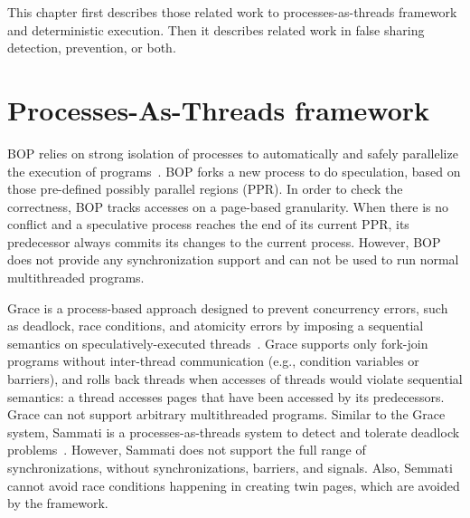 
\label{chapter:relatedwork}
This chapter first describes those related work to processes-as-threads framework and deterministic execution. Then it describes related work in false sharing detection, prevention, or both. 

\section{Processes-As-Threads framework}

BOP relies on strong isolation of processes to automatically and safely parallelize the execution of programs~\cite{DingBOP}. BOP forks a new process to do speculation, based on those pre-defined possibly parallel regions (PPR). In order to check the correctness, BOP tracks accesses on a page-based granularity. When there is no conflict and a speculative process reaches the end of its current PPR, its predecessor always commits its changes to the current process. However, BOP does not provide any synchronization support and can not be used to run normal multithreaded programs. 

Grace is a process-based approach designed to prevent
concurrency errors, such as deadlock, race conditions, and
atomicity errors by imposing a sequential semantics on
speculatively-executed threads~\cite{grace}. Grace supports only fork-join programs without inter-thread communication (e.g., condition variables or barriers), and rolls back threads when accesses of threads would violate sequential semantics: a thread accesses pages that have been accessed by its predecessors. Grace can not support arbitrary multithreaded programs. Similar to the Grace system, Sammati is a processes-as-threads system to detect and tolerate deadlock problems~\cite{Pyla:2010:ADA:1854273.1854288}. However, Sammati does not support the full range of synchronizations, without synchronizations, barriers, and signals. Also, Semmati cannot avoid race conditions happening in creating twin pages, which are avoided by the \Sheriff{} framework.

\begin{comment}
According to Revisions,  Grace cannot easily resolve all
conflicts on commit (like revisions do) and must thus restrict
tasks from producing such conflicts either statically (by type
system) or dynamically (pessimistic with blocking, or optimistic with abort and retry). Also, Grace allows only a restricted “fork-join” form of concurrency
Revisions~\ref{Burckhardt:2010:CPR:1869459.1869515}
\end{comment}

